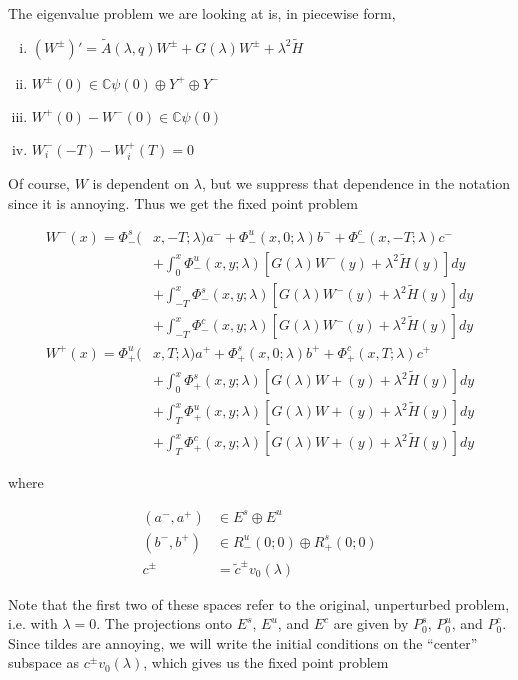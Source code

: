 \documentclass[12pt]{article}
\def\C{{\mathbb C}}
\begin{document}
The eigenvalue problem we are looking at is, in piecewise form,


\begin{enumerate}[(i)]
\item $(W^\pm)' = \tilde{A}(\lambda, q) W^\pm + G(\lambda)W^\pm + \lambda^2 \tilde{H}$
\item $W^\pm(0) \in \C \psi(0) \oplus Y^+ \oplus Y^-$
\item $W^+(0) - W^-(0) \in \C \psi(0)$
\item $W_i^-(-T) - W_i^+(T) = 0$
\end{enumerate}

Of course, $W$ is dependent on $\lambda$, but we suppress that dependence in the notation since it is annoying. Thus we get the fixed point problem

\begin{align*}
W^-(x) = \Phi^s_-(&x, -T; \lambda)a^- + \Phi^u_-(x, 0; \lambda)b^- + \Phi^c_-(x, -T; \lambda)c^- \\
&+ \int_0^x \Phi^u_-(x, y; \lambda)[ G(\lambda)W^-(y) + \lambda^2 \tilde{H}(y) ] dy \\
&+ \int_{-T}^x \Phi^s_-(x, y; \lambda) [ G(\lambda)W^-(y) + \lambda^2 \tilde{H}(y) ] dy \\
&+ \int_{-T}^x \Phi^c_-(x, y; \lambda) [ G(\lambda)W^-(y) + \lambda^2 \tilde{H}(y) ]dy \\
W^+(x) = \Phi^u_+(&x, T; \lambda)a^+ + \Phi^s_+(x, 0; \lambda)b^+ + \Phi^c_+(x, T; \lambda)c^+ \\
&+ \int_0^x \Phi^s_+(x, y; \lambda) [ G(\lambda)W+(y) + \lambda^2 \tilde{H}(y) ] dy \\
&+ \int_T^x \Phi^u_+(x, y; \lambda) [ G(\lambda)W+(y) + \lambda^2 \tilde{H}(y) ] dy \\
&+ \int_T^x \Phi^c_+(x, y; \lambda) [ G(\lambda)W+(y) + \lambda^2 \tilde{H}(y) ] dy
\end{align*}

where

\begin{align*}
(a^-, a^+) &\in E^s \oplus E^u\\
(b^-, b^+) &\in R^u_-(0; 0) \oplus R^s_+(0; 0)\\
c^\pm &= \tilde{c}^\pm v_0(\lambda)
\end{align*}

Note that the first two of these spaces refer to the original, unperturbed problem, i.e. with $\lambda = 0$. The projections onto $E^s$, $E^u$, and $E^c$ are given by $P_0^s$, $P_0^u$, and $P_0^c$. Since tildes are annoying, we will write the initial conditions on the ``center'' subspace as $c^\pm v_0(\lambda)$, which gives us the fixed point problem
\end{document}
